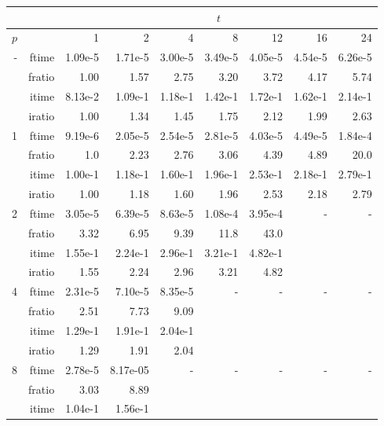 \documentclass[a4]{article}
\begin{document}
\begin{table}
\begin{center}
\begin{tabular}{|r|r|r|r|r|r|r|r|r|}
\hline 
     &  & \multicolumn{7}{c|}{$t$} \\ \hline
    $p$  &  & 1           & 2    & 4    & 8    & 12   & 16    & 24  \\ \hline\hline
    -  & ftime &  1.09e-5 &   1.71e-5 &   3.00e-5 &   3.49e-5 &   4.05e-5 &   4.54e-5 &   6.26e-5   \\ 
      & fratio & 1.00 &    1.57 &    2.75 &    3.20 &    3.72 &    4.17 &    5.74   \\ 
     & itime &   8.13e-2 &    1.09e-1 &   1.18e-1 &   1.42e-1 &   1.72e-1 &   1.62e-1 &   2.14e-1    \\ 
     & iratio &    1.00 &    1.34 &    1.45 &    1.75 &    2.12 &    1.99 &    2.63    \\ \hline \hline
    1  & ftime & 9.19e-6 & 2.05e-5 & 2.54e-5 &  2.81e-5 &   4.03e-5 &   4.49e-5 &  1.84e-4 \\ 
      & fratio & 1.0 & 2.23 & 2.76 &  3.06 &   4.39 &  4.89 &  20.0 \\ 
     & itime &  1.00e-1 &   1.18e-1 &   1.60e-1 &   1.96e-1 &   2.53e-1 &   2.18e-1 &   2.79e-1   \\ 
     & iratio &  1.00 &    1.18 &    1.60 &    1.96 &    2.53 &    2.18 &    2.79   \\ \hline
    2  & ftime & 3.05e-5 &  6.39e-5 &  8.63e-5 &  1.08e-4 &  3.95e-4 & - & - \\ 
      & fratio & 3.32 &  6.95 &  9.39 &  11.8 &   43.0 &  &  \\
      & itime &   1.55e-1 &   2.24e-1 &   2.96e-1 &   3.21e-1 &   4.82e-1   &  &  \\
      & iratio &  1.55 &    2.24 &    2.96 &    3.21 &    4.82    &  &  \\ \hline
    4  & ftime &  2.31e-5 &  7.10e-5  & 8.35e-5 & - & - & - & - \\ 
      & fratio & 2.51 &  7.73  & 9.09 &  &  &  &  \\
      & itime &   1.29e-1 &   1.91e-1 &   2.04e-1    &  & & & \\
      & iratio &  1.29 &    1.91 &    2.04    &  & & &  \\ \hline
    8  & ftime & 2.78e-5 &  8.17e-05 & - & - & - & - & - \\ 
      & fratio & 3.03 &  8.89 &  &  &  &  &  \\
      & itime &   1.04e-1 &   1.56e-1    &  & & & & \\

\end{tabular}
\end{center}
\end{table}
\end{document}
